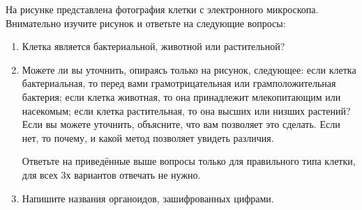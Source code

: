 
На рисунке представлена фотография клетки с электронного микроскопа. Внимательно изучите рисунок и ответьте на следующие вопросы:

\begin{enumerate}
    \item Клетка является бактериальной, животной или растительной?
    \item Можете ли вы уточнить, опираясь только на рисунок, следующее: если клетка бактериальная, то перед вами грамотрицательная или грамположительная бактерия; если клетка животная, то она принадлежит млекопитающим или насекомым; 
    если клетка растительная, то она высших или низших растений? Если вы можете уточнить, объясните, 
    что вам позволяет это сделать. Если нет, то почему, и какой метод позволяет увидеть различия.

    Ответьте на приведённые выше вопросы только для правильного типа клетки, для всех 3х вариантов отвечать не 
    нужно.
    \item Напишите названия органоидов, зашифрованных цифрами.
\end{enumerate}

